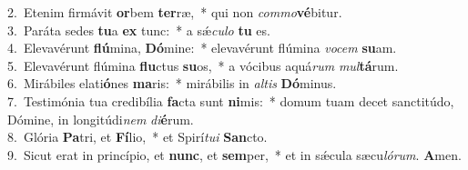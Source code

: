 {2.~}Etenim firmávit \textbf{or}bem \textbf{ter}ræ,~* qui non \textit{com}\textit{mo}\textbf{vé}bitur.\\
{3.~}Paráta sedes \textbf{tu}a \textbf{ex} tunc:~* a sǽ\textit{cu}\textit{lo} \textbf{tu} es.\\
{4.~}Elevavérunt \textbf{flú}mina, \textbf{Dó}mine:~* elevavérunt flúmina \textit{vo}\textit{cem} \textbf{su}am.\\
{5.~}Elevavérunt flúmina \textbf{flu}ctus \textbf{su}os,~* a vócibus aquá\textit{rum} \textit{mul}\textbf{tá}rum.\\
{6.~}Mirábiles elati\textbf{ó}nes \textbf{ma}ris:~* mirábilis in \textit{al}\textit{tis} \textbf{Dó}minus.\\
{7.~}Testimónia tua credibília \textbf{fa}cta sunt \textbf{ni}mis:~* domum tuam decet sanctitúdo, Dómine, in longitúdi\textit{nem} \textit{di}\textbf{é}rum.\\
{8.~}Glória \textbf{Pa}tri, et \textbf{Fí}lio,~* et Spirí\textit{tu}\textit{i} \textbf{San}cto.\\
{9.~}Sicut erat in princípio, et \textbf{nunc}, et \textbf{sem}per,~* et in sǽcula sæcu\textit{ló}\textit{rum}. \textbf{A}men.\\
